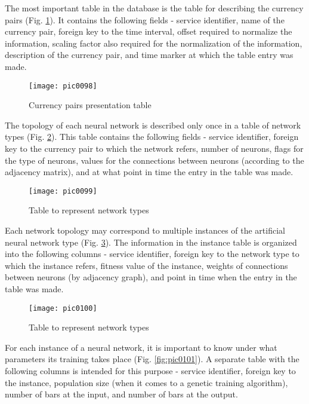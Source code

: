 The most important table in the database is the table for describing the currency pairs (Fig. \ref{fig:pic0098}). It contains the following fields - service identifier, name of the currency pair, foreign key to the time interval, offset required to normalize the information, scaling factor also required for the normalization of the information, description of the currency pair, and time marker at which the table entry was made.

\begin{figure}[h]
\centering
\texttt{[image: pic0098]}
\caption{Currency pairs presentation table}
\label{fig:pic0098}
\end{figure}
\FloatBarrier

The topology of each neural network is described only once in a table of network types (Fig. \ref{fig:pic0099}). This table contains the following fields - service identifier, foreign key to the currency pair to which the network refers, number of neurons, flags for the type of neurons, values for the connections between neurons (according to the adjacency matrix), and at what point in time the entry in the table was made.

\begin{figure}[h]
\centering
\texttt{[image: pic0099]}
\caption{Table to represent network types}
\label{fig:pic0099}
\end{figure}
\FloatBarrier

Each network topology may correspond to multiple instances of the artificial neural network type (Fig. \ref{fig:pic0100}). The information in the instance table is organized into the following columns - service identifier, foreign key to the network type to which the instance refers, fitness value of the instance, weights of connections between neurons (by adjacency graph), and point in time when the entry in the table was made.

\begin{figure}[h]
\centering
\texttt{[image: pic0100]}
\caption{Table to represent network types}
\label{fig:pic0100}
\end{figure}
\FloatBarrier

For each instance of a neural network, it is important to know under what parameters its training takes place (Fig. \ref{fig:pic0101}). A separate table with the following columns is intended for this purpose - service identifier, foreign key to the instance, population size (when it comes to a genetic training algorithm), number of bars at the input, and number of bars at the output.

